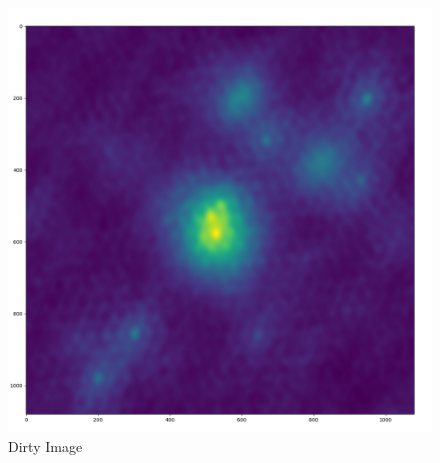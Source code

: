 \begin{figure}[h]
	\centering
	\includegraphics[width=0.5\linewidth]{./chapters/05.algorithms/results/sim00_mixed_sources_dirty.png}
	\caption{Dirty Image}
	\label{alg:gauss:dirty}
\end{figure}

